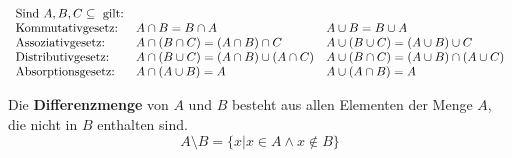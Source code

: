 \documentclass[11pt]{article}
\begin{document}
$
  \begin{array}{l l l}
    \text{Sind } A, B, C \subseteq \text{ gilt:}                                                                                \\
    \text{Kommutativgesetz:}  & A \cap B = B \cap A                            & A \cup B = B \cup A                            \\
    \text{Assoziativgesetz:}  & A \cap (B \cap C) = (A \cap B) \cap C          & A \cup (B \cup C) = (A \cup B) \cup C          \\
    \text{Distributivgesetz:} & A \cap (B \cup C) = (A \cap B) \cup (A \cap C) & A \cup (B \cap C) = (A \cup B) \cap (A \cup C) \\
    \text{Absorptionsgesetz:} & A \cap (A \cup B) = A                          & A \cup (A \cap B) = A                          \\
  \end{array}
$

Die \textbf{Differenzmenge} von $A$ und $B$ besteht aus allen Elementen der Menge $A$, die nicht in $B$ enthalten sind.
\[
  A \setminus B = \{x | x \in A \land x \notin B\}
\]
\end{document}
